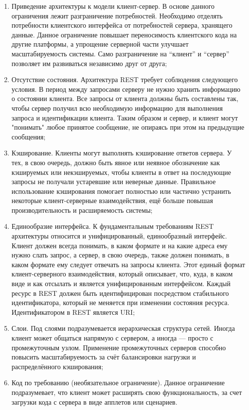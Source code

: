 \begin{enumerate}
	\item Приведение архитектуры к модели клиент-сервер. В основе данного ограничения лежит разграничение потребностей. Необходимо отделять потребности клиентского интерфейса от потребностей сервера, хранящего данные. Данное ограничение повышает переносимость клиентского кода на другие платформы, а упрощение серверной части улучшает масштабируемость системы. Само разграничение на “клиент” и “сервер” позволяет им развиваться независимо друг от друга; 
	\item Отсутствие состояния. Архитектура REST требует соблюдения следующего условия. В период между запросами серверу не нужно хранить информацию о состоянии клиента. Все запросы от клиента должны быть составлены так, чтобы сервер получил всю необходимую информацию для выполнения запроса и идентификации клиента. Таким образом и сервер, и клиент могут "понимать" любое принятое сообщение, не опираясь при этом на предыдущие сообщения; 
	\item Кэширование. Клиенты могут выполнять кэширование ответов сервера. У тех, в свою очередь, должно быть явное или неявное обозначение как кэшируемых или некэшируемых, чтобы клиенты в ответ на последующие запросы не получали устаревшие или неверные данные. Правильное использование кэширования помогает полностью или частично устранить некоторые клиент-серверные взаимодействия, ещё больше повышая производительность и расширяемость системы;
	\item Единообразие интерфейса. К фундаментальным требованиям REST архитектуры относится и унифицированный, единообразный интерфейс. Клиент должен всегда понимать, в каком формате и на какие адреса ему нужно слать запрос, а сервер, в свою очередь, также должен понимать, в каком формате ему следует отвечать на запросы клиента. Этот единый формат клиент-серверного взаимодействия, который описывает, что, куда, в каком виде и как отсылать и является унифицированным интерфейсом. Каждый ресурс в REST должен быть идентифицирован посредством стабильного идентификатора, который не меняется при изменении состояния ресурса. Идентификатором в REST является URI;
	\item Слои. Под слоями подразумевается иерархическая структура сетей. Иногда клиент может общаться напрямую с сервером, а иногда — просто с промежуточным узлом. Применение промежуточных серверов способно повысить масштабируемость за счёт балансировки нагрузки и распределённого кэширования; 
	\item Код по требованию (необязательное ограничение). Данное ограничение подразумевает, что клиент может расширять свою функциональность, за счет загрузки кода с сервера в виде апплетов или сценариев. 
\end{enumerate}

